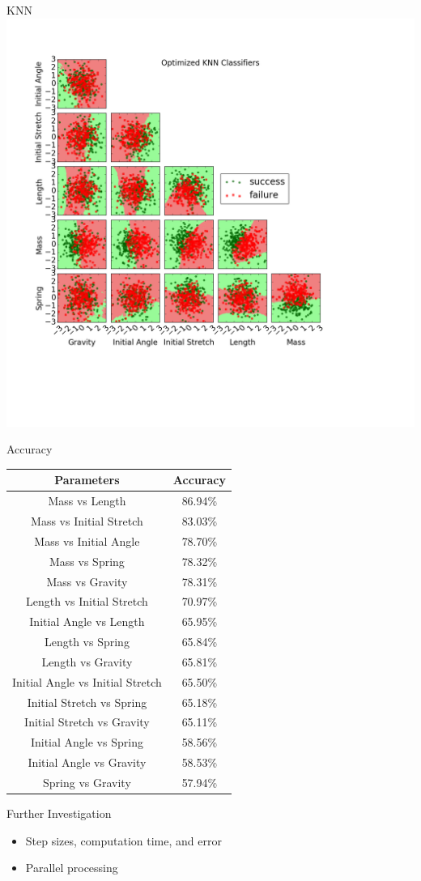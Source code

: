 \documentclass{beamer}
\begin{document}
\begin{frame}{KNN}
\centering
\includegraphics[scale=0.25]{images/KNNPlot.png}
\end{frame}

\begin{frame}{Accuracy}
\centering
\small
    \begin{tabular}{| c | c |}
    \hline
    Parameters & Accuracy \\ \hline
    Mass vs Length & 86.94\% \\ 
    Mass vs Initial Stretch & 83.03\% \\ 
    Mass vs Initial Angle & 78.70\% \\
    Mass vs Spring & 78.32\% \\    
    Mass vs Gravity & 78.31\% \\
    Length vs Initial Stretch & 70.97\% \\
    Initial Angle vs Length & 65.95\% \\
    Length vs Spring & 65.84\% \\
    Length vs Gravity & 65.81\% \\    
    Initial Angle vs Initial Stretch & 65.50\% \\    
	Initial Stretch vs Spring & 65.18\% \\
    Initial Stretch vs Gravity & 65.11\% \\	    
    Initial Angle vs Spring & 58.56\% \\
    Initial Angle vs Gravity & 58.53\% \\   
    Spring vs Gravity & 57.94\% \\
 \hline
\end{tabular} 
\end{frame}

\begin{frame}{Further Investigation}
\begin{itemize}
  \item Step sizes, computation time, and error \newline
  \item Parallel processing
\end{itemize}
\end{frame}
\end{document}
